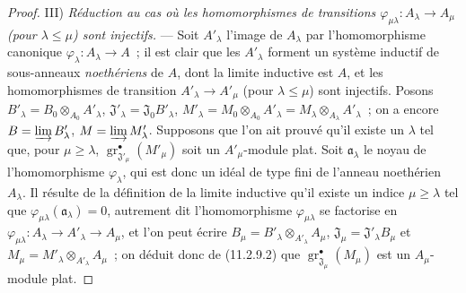 \begin{proof}
\medskip
\noindent III) \emph{Réduction au cas où les homomorphismes de
transitions $\varphi_{\mu\lambda}:A_\lambda\to A_\mu$ (pour
$\lambda\leq\mu$) sont injectifs.} --- Soit $A'_\lambda$ l'image de
$A_\lambda$ par l'homomorphisme canonique $\varphi_\lambda:A_\lambda\to A$~;
il est clair que les $A'_\lambda$ forment un système inductif de sous-anneaux
\emph{noethériens} de $A$, dont la limite inductive est $A$, et les homomorphismes de
transition $A'_\lambda\to A'_\mu$ (pour $\lambda\leq\mu$) sont injectifs.
Posons $B'_\lambda=B_0\otimes_{A_0}A'_\lambda$,
$\mathfrak J'_\lambda=\mathfrak J_0B'_\lambda$,
$M'_\lambda=M_0\otimes_{A_0}A'_\lambda=M_\lambda\otimes_{A_\lambda}A'_\lambda$~;
on a encore $B=\varinjlim B'_\lambda$, $M=\varinjlim M'_\lambda$. Supposons
que l'on ait prouvé qu'il existe un $\lambda$ tel que, pour $\mu\geq\lambda$,
$\operatorname{gr}_{\mathfrak J'_\mu}^\bullet(M'_\mu)$ soit un $A'_\mu$-module
plat. Soit $\mathfrak a_\lambda$ le noyau de l'homomorphisme $\varphi_\lambda$,
qui est donc un idéal de type fini de l'anneau noethérien $A_\lambda$. Il
résulte de la définition de la limite inductive qu'il existe un indice
$\mu\geq\lambda$ tel que $\varphi_{\mu\lambda}(\mathfrak a_\lambda)=0$,
autrement dit l'homomorphisme $\varphi_{\mu\lambda}$ se factorise en
$\varphi_{\mu\lambda}:A_\lambda\to A'_\lambda\to A_\mu$, et l'on peut écrire
$B_\mu=B'_\lambda\otimes_{A'_\lambda}A_\mu$,
$\mathfrak J_\mu=\mathfrak J'_\lambda B_\mu$ et
$M_\mu=M'_\lambda\otimes_{A'_\lambda}A_\mu$~; on déduit donc de (11.2.9.2)
que $\operatorname{gr}_{\mathfrak J_\mu}^\bullet(M_\mu)$ est un $A_\mu$-module
plat.


\end{proof}
